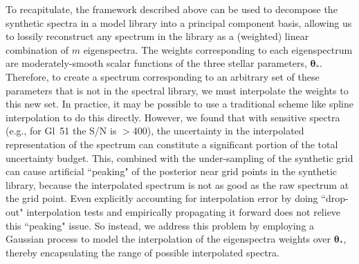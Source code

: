 \documentclass[iop,floatfix,numberedappendix,twocolappendix]{emulateapj}
\newcommand{\vt}{ {\bm \theta}}
\begin{document}
To recapitulate, the framework described above can be used to decompose the synthetic spectra in a 
model library into a principal component basis, allowing us to lossily reconstruct any spectrum in 
the library as a (weighted) linear combination of $m$ eigenspectra.  The weights corresponding to 
each eigenspectrum are moderately-smooth scalar functions of the three stellar parameters, 
$\vt_{\ast}$.  Therefore, to create a spectrum corresponding to an arbitrary set of these 
parameters that is not in the spectral library, we must interpolate the weights to this new set.  
In practice, it may be possible to use a traditional scheme like spline interpolation to do this 
directly.  However, we found that with sensitive spectra (e.g., for Gl~51 the S/N is $>$400), the 
uncertainty in the interpolated representation of the spectrum can constitute a significant portion 
of the total uncertainty budget.  This, combined with the under-sampling of the synthetic grid can 
cause artificial ``peaking" of the posterior near grid points in the synthetic library, because the 
interpolated spectrum is not as good as the raw spectrum at the grid point.  Even explicitly 
accounting for interpolation error by doing ``drop-out" interpolation tests and empirically 
propagating it forward does not relieve this ``peaking" issue.  So instead, we address this problem 
by employing a Gaussian process to model the interpolation of the eigenspectra weights over 
$\vt_{\ast}$, thereby encapsulating the range of possible interpolated spectra. 
\end{document}
